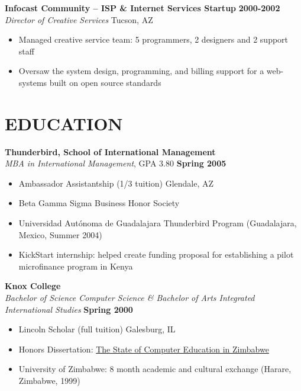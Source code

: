 \documentclass{res}
\begin{document}
\begin{resume}
\textbf{Infocast Community -- ISP \& Internet Services Startup} \hfill \textbf{2000-2002} \\
\emph{Director of Creative Services} \hfill Tucson, AZ
 \begin{itemize} \itemsep -2pt
  \item Managed creative service team: 5 programmers, 2 designers and 2 support staff
  \item Oversaw the system design, programming, and billing support for a web-systems built on open source standards
\end{itemize} \vspace{-6pt}

\section{EDUCATION} 
\vspace{8pt} 
\textbf{Thunderbird, School of International Management}  \\
\emph{MBA in International Management}, GPA 3.80 \hfill \textbf{Spring 2005}
   \begin{itemize} \itemsep -2pt %
		\item Ambassador Assistantship (1/3 tuition)   \hfill Glendale, AZ
		\item Beta Gamma Sigma Business Honor Society
		\item Universidad Autónoma de Guadalajara Thunderbird Program (Guadalajara, Mexico, Summer 2004)  
		\item KickStart internship: helped create funding proposal for establishing a pilot microfinance program in Kenya
	\end{itemize} \vspace{-6pt}

	\vspace{8pt} 
	\textbf{Knox College}  \\
	\emph{Bachelor of Science Computer Science \& Bachelor of Arts Integrated International Studies} \hfill \textbf{Spring 2000}
	   \begin{itemize} \itemsep -2pt %
			\item Lincoln Scholar (full tuition)   \hfill Galesburg, IL
			\item Honors Dissertation: \underline{The State of Computer Education in Zimbabwe} 
			\item University of Zimbabwe: 8 month academic and cultural exchange (Harare, Zimbabwe, 1999)
		\end{itemize}


\end{resume}
\end{document}
